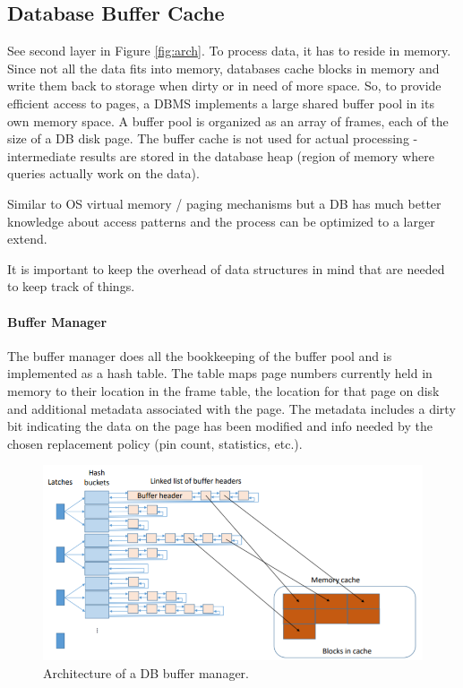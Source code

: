 \subsection{Database Buffer Cache}

See second layer in Figure \ref{fig:arch}. To process data, it has to reside in memory. Since not all the data fits into memory, databases cache blocks in memory and write them back to storage when dirty or in need of more space. So, to provide efficient access to pages, a DBMS implements a large shared buffer pool in its own memory space. A buffer pool is organized as an array of frames, each of the size of a DB disk page. The buffer cache is not used for actual processing - intermediate results are stored in the database heap (region of memory where queries actually work on the data).

Similar to OS virtual memory / paging mechanisms but a DB has much better knowledge about access patterns and the process can be optimized to a larger extend.

It is important to keep the overhead of data structures in mind that are needed to keep track of things.

\paragraph{Buffer Manager}
The buffer manager does all the bookkeeping of the buffer pool and is implemented as a hash table. The table maps page numbers currently held in memory to their location in the frame table, the location for that page on disk and additional metadata associated with the page. The metadata includes a dirty bit indicating the data on the page has been modified and info needed by the chosen replacement policy (pin count, statistics, etc.).

\begin{figure}[h]
	\centering
	\includegraphics[scale=0.8]{images/1-buffer.PNG}
	\caption{Architecture of a DB buffer manager.}
	\label{fig:buffer}
\end{figure}


